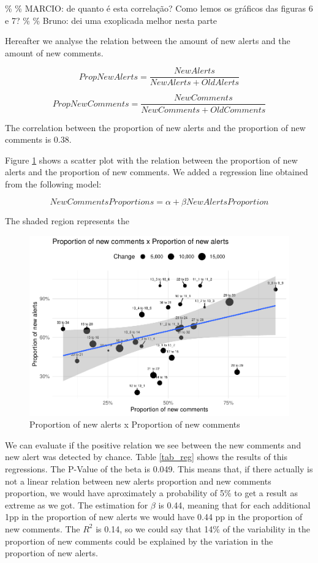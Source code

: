 \documentclass[
]{article}
\begin{document}
\normalsize

\newpage

\small

\normalsize

\% \% MARCIO: de quanto é esta correlação? Como lemos os gráficos das
figuras 6 e 7? \% \% Bruno: dei uma exoplicada melhor nesta parte

Hereafter we analyse the relation between the amount of new alerts and
the amount of new comments.

\[PropNewAlerts = \frac{NewAlerts}{NewAlerts + OldAlerts}\]

\[PropNewComments = \frac{NewComments}{NewComments + OldComments}\]

The correlation between the proportion of new alerts and the proportion
of new comments is 0.38.

Figure \ref{scatter_prop} shows a scatter plot with the relation between
the proportion of new alerts and the proportion of new comments. We
added a regression line obtained from the following model:

\[ NewCommentsProportions = \alpha + \beta NewAlertsProportion \]

The shaded region represents the

\small

\begin{figure}
\centering
\includegraphics{report_files/figure-latex/unnamed-chunk-22-1.pdf}
\caption{\label{scatter_prop}Proportion of new alerts x Proportion of
new comments}
\end{figure}

\normalsize

We can evaluate if the positive relation we see between the new comments
and new alert was detected by chance. Table \ref{tab_reg} shows the
results of this regressions. The P-Value of the beta is 0.049. This
means that, if there actually is not a linear relation between new
alerts proportion and new comments proportion, we would have
aproximately a probability of 5\% to get a result as extreme as we got.
The estimation for \(\beta\) is 0.44, meaning that for each additional
1pp in the proportion of new alerts we would have 0.44 pp in the
proportion of new comments. The \(R^2\) is 0.14, so we could say that
14\% of the variability in the proportion of new comments could be
explained by the variation in the proportion of new alerts.
\end{document}
